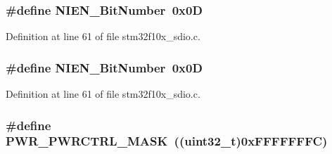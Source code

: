 \subsubsection[{\texorpdfstring{N\+I\+E\+N\+\_\+\+Bit\+Number}{NIEN_BitNumber}}]{\setlength{\rightskip}{0pt plus 5cm}\#define N\+I\+E\+N\+\_\+\+Bit\+Number~0x0D}\hypertarget{group___s_d_i_o___private___types_definitions_gab6d83a7ccd4a0d9ea9a09fec263fb25f}{}\label{group___s_d_i_o___private___types_definitions_gab6d83a7ccd4a0d9ea9a09fec263fb25f}


Definition at line 61 of file stm32f10x\+\_\+sdio.\+c.

\subsubsection[{\texorpdfstring{N\+I\+E\+N\+\_\+\+Bit\+Number}{NIEN_BitNumber}}]{\setlength{\rightskip}{0pt plus 5cm}\#define N\+I\+E\+N\+\_\+\+Bit\+Number~0x0D}\hypertarget{group___s_d_i_o___private___types_definitions_gab6d83a7ccd4a0d9ea9a09fec263fb25f}{}\label{group___s_d_i_o___private___types_definitions_gab6d83a7ccd4a0d9ea9a09fec263fb25f}


Definition at line 61 of file stm32f10x\+\_\+sdio.\+c.

\subsubsection[{\texorpdfstring{P\+W\+R\+\_\+\+P\+W\+R\+C\+T\+R\+L\+\_\+\+M\+A\+SK}{PWR_PWRCTRL_MASK}}]{\setlength{\rightskip}{0pt plus 5cm}\#define P\+W\+R\+\_\+\+P\+W\+R\+C\+T\+R\+L\+\_\+\+M\+A\+SK~(({\bf uint32\+\_\+t})0x\+F\+F\+F\+F\+F\+F\+F\+C)}\hypertarget{group___s_d_i_o___private___types_definitions_ga7e6ec7be68d0fbb8fb4e3725cca9a05c}{}\label{group___s_d_i_o___private___types_definitions_ga7e6ec7be68d0fbb8fb4e3725cca9a05c}


